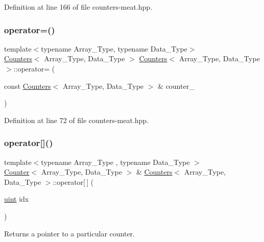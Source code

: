 Definition at line 166 of file counters-\/meat.\+hpp.

\mbox{\label{class_counters_a0edeb22b0b1640f7ada1ef47a30ac486}} 
\subsubsection{\texorpdfstring{operator=()}{operator=()}}
{\footnotesize\ttfamily template$<$typename Array\+\_\+\+Type, typename Data\+\_\+\+Type$>$ \\
\hyperlink{class_counters}{Counters}$<$ Array\+\_\+\+Type, Data\+\_\+\+Type $>$ \hyperlink{class_counters}{Counters}$<$ Array\+\_\+\+Type, Data\+\_\+\+Type $>$\+::operator= (\begin{DoxyParamCaption}\item[{const \hyperlink{class_counters}{Counters}$<$ Array\+\_\+\+Type, Data\+\_\+\+Type $>$ \&}]{counter\+\_\+ }\end{DoxyParamCaption})}



Definition at line 72 of file counters-\/meat.\+hpp.

\mbox{\label{class_counters_a031002f578171aaa615d08b1a2f9be40}} 
\subsubsection{\texorpdfstring{operator[]()}{operator[]()}}
{\footnotesize\ttfamily template$<$typename Array\+\_\+\+Type , typename Data\+\_\+\+Type $>$ \\
\hyperlink{class_counter}{Counter}$<$ Array\+\_\+\+Type, Data\+\_\+\+Type $>$ \& \hyperlink{class_counters}{Counters}$<$ Array\+\_\+\+Type, Data\+\_\+\+Type $>$\+::operator\mbox{[}$\,$\mbox{]} (\begin{DoxyParamCaption}\item[{\hyperlink{typedefs_8hpp_a91ad9478d81a7aaf2593e8d9c3d06a14}{uint}}]{idx }\end{DoxyParamCaption})\hspace{0.3cm}{\ttfamily [inline]}}



Returns a pointer to a particular counter. 


